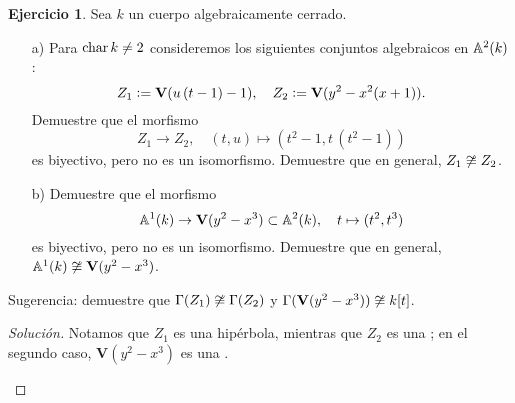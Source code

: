 \documentclass{article}
\theoremstyle{definition}
\newtheorem{ejerc}{Ejercicio}
\newenvironment{solucion}{\begin{proof}[Solución]}{\end{proof}}
\begin{document}
\begin{ejerc}
  Sea $k$ un cuerpo algebraicamente cerrado.

  \begin{enumerate}
  \item[a)] Para $\fchar k \ne 2$ consideremos los siguientes conjuntos
    algebraicos en $\AA^2 (k)$:
    $$Z_1 \dfn \mathbf{V} (u\,(t - 1) - 1), \quad Z_2 \dfn \mathbf{V} (y^2 - x^2 (x + 1)).$$
    Demuestre que el morfismo
    $$Z_1 \to Z_2, \quad (t, u) \mapsto (t^2 - 1, t\,(t^2 - 1))$$
    es biyectivo, pero no es un isomorfismo. Demuestre que en general,
    $Z_1 \not\isom Z_2$.

  \item[b)] Demuestre que el morfismo
    \[ \AA^1 (k) \to \mathbf{V} (y^2 - x^3) \subset \AA^2 (k), \quad
       t \mapsto (t^2, t^3) \]
    es biyectivo, pero no es un isomorfismo. Demuestre que en general,
    $\AA^1 (k) \not\isom \mathbf{V} (y^2 - x^3)$.
  \end{enumerate}

  \noindent Sugerencia: demuestre que $\Gamma (Z_1) \not\isom \Gamma (Z_2)$ y
  $\Gamma (\mathbf{V} (y^2 - x^3)) \not\isom k[t]$.

  \ifdefined\solutions\begin{solucion}
    Notamos que $Z_1$ es una hipérbola, mientras que $Z_2$ es una
    ; en el segundo caso, $\mathbf{V} (y^2 - x^3)$ es una
    .

    \begin{center}
      \quad\quad {}
\end{center}
\end{solucion}
\end{ejerc}
\end{document}

